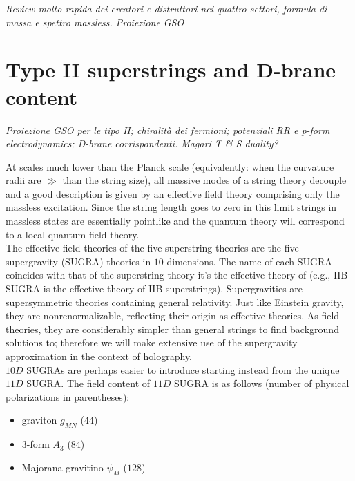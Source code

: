 \documentclass[11pt,a4paper,oneside,openright,titlepage]{book}
\newcommand{\cmmnt}[1]{\textcolor{Mahogany}{\emph{#1}}}
\begin{document}
\cmmnt{Review molto rapida dei creatori e distruttori nei quattro settori, formula di massa e spettro massless. Proiezione GSO}

\section{Type II superstrings and D-brane content}

\cmmnt{Proiezione GSO per le tipo II; chiralità dei fermioni; potenziali RR e p-form electrodynamics; D-brane corrispondenti. Magari T \& S duality?}


At scales much lower than the Planck scale (equivalently: when the curvature radii are $\gg$ than the string size), all massive modes of a string theory decouple and a good description is given by an effective field theory comprising only the massless excitation. Since the string length goes to zero in this limit strings in massless states are essentially pointlike and the quantum theory will correspond to a local quantum field theory.\\

The effective field theories of the five superstring theories are the five supergravity (SUGRA) theories in $10$ dimensions. The name of each SUGRA coincides with that of the superstring theory it's the effective theory of (e.g., IIB SUGRA is the effective theory of IIB superstrings). Supergravities are supersymmetric theories containing general relativity. Just like Einstein gravity, they are nonrenormalizable, reflecting their origin as effective theories. As field theories, they are considerably simpler than general strings to find background solutions to; therefore we will make extensive use of the supergravity approximation in the context of holography.\\

$10D$ SUGRAs are perhaps easier to introduce starting instead from the unique $11D$ SUGRA. The field content of $11D$ SUGRA is as follows (number of physical polarizations in parentheses):

\begin{itemize}
\item graviton $g_{MN}$ ($44$)
\item 3-form $A_3$ ($84$)
\item Majorana gravitino $\psi_M$ ($128$)
\end{itemize}
\end{document}
